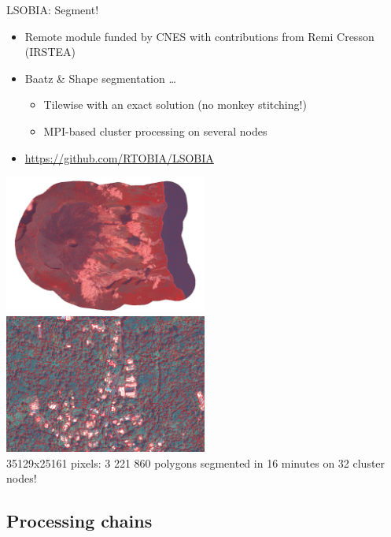 \begin{frame}{LSOBIA: Segment!}
  \begin{itemize}
    \item Remote module funded by CNES with contributions from Remi Cresson (IRSTEA)
    \item Baatz \& Shape segmentation \ldots
      \begin{itemize}
      \item Tilewise with an exact solution (no monkey stitching!)
      \item MPI-based cluster processing on several nodes
      \end{itemize}
    \item \url{https://github.com/RTOBIA/LSOBIA}
  \end{itemize}

  \includegraphics[width=0.5\textwidth]{images/seg_reunion.png}
  \includegraphics[width=0.5\textwidth]{images/seg_reunion_zoom.png}\\
  35129x25161 pixels: 3 221 860 polygons segmented in 16 minutes on 32 cluster nodes!
\end{frame}

\subsection{Processing chains}
  
